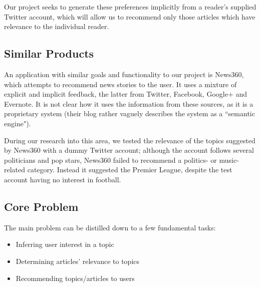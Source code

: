 \documentclass[11pt]{article}
\begin{document}
Our project seeks to generate these preferences implicitly from a reader's supplied Twitter account, which will allow us to recommend only those articles which have relevance to the individual reader. 

\subsection{Similar Products}
An application with similar goals and functionality to our project is News360\cite{news360}, which attempts to recommend news stories to the user. It uses a mixture of explicit and implicit feedback, the latter from Twitter, Facebook, Google+ and Evernote. It is not clear how it uses the information from these sources, as it is a proprietary system (their blog rather vaguely describes the system as a ``semantic engine"). 

During our research into this area, we tested the relevance of the topics suggested by News360 with a dummy Twitter account; although the account follows several politicians and pop stars, News360 failed to recommend a politics- or music-related category. Instead it suggested the Premier League, despite the test account having no interest in football.  

\subsection{Core Problem}
The main problem can be distilled down to a few fundamental tasks: 
\begin{itemize}
\item Inferring user interest in a topic 
\item Determining articles' relevance to topics 
\item Recommending topics/articles to users

\end{itemize} 


\end{document}
